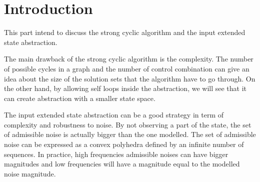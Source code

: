 \section{Introduction}
This part intend to discuss the strong cyclic algorithm and the input extended state abstraction.

The main drawback of the strong cyclic algorithm is the complexity.
The number of possible cycles in a graph and the number of control combination can give an idea about the size of the solution sets that the algorithm have to go through.
On the other hand, by allowing self loops inside the abstraction, we will see that it can create abstraction with a smaller state space.

The input extended state abstraction can be a good strategy in term of complexity and robustness to noise.
By not observing a part of the state, the set of admissible noise is actually bigger than the one modelled.
The set of admissible noise can be expressed as a convex polyhedra defined by an infinite number of sequences. In practice, high frequencies admissible noises can have bigger magnitudes and low frequencies will have a magnitude equal to the modelled noise magnitude.

